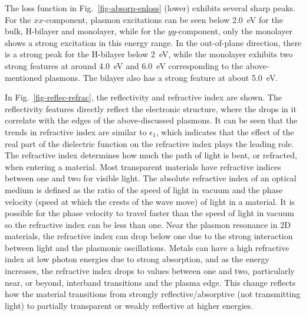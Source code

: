 \documentclass[aps,prb,preprint,notitlepage]{revtex4-2}
\begin{document}
The loss function in Fig.~\ref{fig-absorp-enloss} (lower)  exhibits several sharp 
peaks. 
For the $xx$-component, plasmon excitations can be
seen below 2.0~eV for the bulk, H-bilayer and monolayer, while for the 
$yy$-component, only the monolayer shows a strong excitation in this 
energy range. In the out-of-plane direction, there is a strong
peak for the H-bilayer below 2~eV, while the monolayer exhibits two strong features
at around 4.0~eV and 6.0~eV corresponding to the above-mentioned plasmons.
The bilayer also has a strong feature at about 5.0~eV. 

In Fig.~\ref{fig-reflec-refrac}, the reflectivity and refractive index are 
shown.
The reflectivity features directly reflect the electronic structure, where
the drops in it correlate with the edges of the above-discussed
plasmons.  
It can be seen that the trends in refractive index are similar to $\epsilon_1$, which indicates that the  effect of the real part of the dielectric function on the refractive index plays the leading role. 
The refractive index determines how much the path of light is bent, or refracted, when entering a 
material. Most transparent materials have refractive indices between 
one and two 
for visible light. 
The absolute refractive index of an optical medium is defined as 
the ratio of the speed of light in vacuum and the phase velocity (speed at which the crests of the wave move) of light in a material.  
It is possible for the phase velocity to travel faster than the speed of light in vacuum so the refractive index can be less than one.  
Near the plasmon resonance in 2D materials, the refractive index can drop below one due to the strong interaction between light and the plasmonic oscillations.
Metals can have a high refractive index at low photon energies 
due to strong absorption, and as the energy increases, 
the refractive index drops to values between one and two, 
particularly near, or beyond, interband transitions and the plasma edge. This change reflects how the material transitions from strongly reflective/absorptive (not transmitting light)
to partially transparent or weakly reflective at higher energies.
\end{document}
